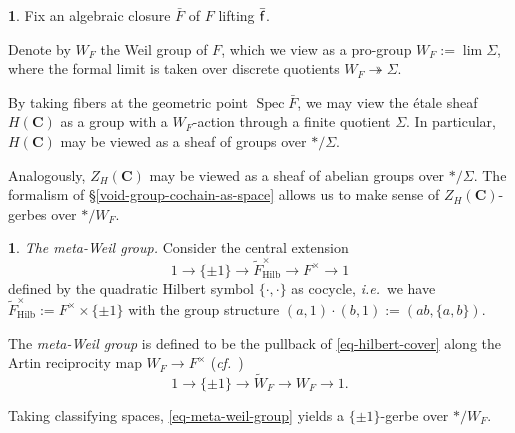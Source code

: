 \documentclass[10pt,english,reqno]{amsart}
\newcommand{\complexes}{\mathbf C}
\newcommand{\residue}{\textnormal{\textsf{f}}}
\newcommand{\Spec}{\operatorname{Spec}}
\newcommand{\Hilbert}{\mathrm{Hilb}}
\theoremstyle{definition}
\numberwithin{equation}{section}
\newtheorem{untitledsubsubsection}[subsubsection]{}
\newenvironment{void}
{\begin{untitledsubsubsection}}
{\end{untitledsubsubsection}}
\begin{document}

\begin{void}
\label{void-weil-group-classifying-space}
Fix an algebraic closure $\bar F$ of $F$ lifting $\bar{\residue}$.

Denote by $W_F$ the Weil group of $F$, which we view as a pro-group $W_F := \lim \Sigma$, where the formal limit is taken over discrete quotients $W_F \twoheadrightarrow \Sigma$.

By taking fibers at the geometric point $\Spec\bar F$, we may view the \'etale sheaf $H(\complexes)$ as a group with a $W_F$-action through a finite quotient $\Sigma$. In particular, $H(\complexes)$ may be viewed as a sheaf of groups over $*/\Sigma$.

Analogously, $Z_H(\complexes)$ may be viewed as a sheaf of abelian groups over $*/\Sigma$. The formalism of \S\ref{void-group-cochain-as-space} allows us to make sense of $Z_H(\complexes)$-gerbes over $*/W_F$.
\end{void}


\begin{void}\emph{The meta-Weil group.}
Consider the central extension
\begin{equation}
\label{eq-hilbert-cover}
1 \rightarrow \{\pm 1\} \rightarrow \widetilde F^{\times}_{\Hilbert} \rightarrow F^{\times} \rightarrow 1
\end{equation}
defined by the quadratic Hilbert symbol $\{\cdot, \cdot\}$ as cocycle, \emph{i.e.}~we have $\widetilde F^{\times}_{\Hilbert} := F^{\times} \times \{\pm 1\}$ with the group structure $(a, 1)\cdot (b, 1) := (ab, \{a, b\})$.

The \emph{meta-Weil group} is defined to be the pullback of \eqref{eq-hilbert-cover} along the Artin reciprocity map $W_F \rightarrow F^{\times}$ (\emph{cf.}~\cite[\S4]{MR3802418})
\begin{equation}
\label{eq-meta-weil-group}
1 \rightarrow \{\pm 1\} \rightarrow \widetilde W_F \rightarrow W_F \rightarrow 1.
\end{equation}

Taking classifying spaces, \eqref{eq-meta-weil-group} yields a $\{\pm 1\}$-gerbe over $*/W_F$.
\end{void}

\end{document}
